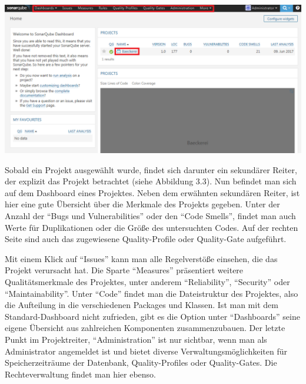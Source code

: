 \begin{minipage}{\linewidth}
	\centering
	\includegraphics[scale=0.55]{img/StartSeiteSonar.PNG}
	\vspace{2em}
\end{minipage}

Sobald ein Projekt ausgewählt wurde, findet sich darunter ein sekundärer Reiter, der explizit das Projekt betrachtet (siehe Abbildung 3.3). Nun befindet man sich auf dem Dashboard eines Projektes. Neben dem erwähnten sekundären Reiter, ist hier eine gute Übersicht über die Merkmale des Projekts gegeben. Unter der Anzahl der \enquote{Bugs und Vulnerabilities} oder den \enquote{Code Smells}, findet man auch Werte für Duplikationen oder die Größe des untersuchten Codes. Auf der rechten Seite sind auch das zugewiesene Quality-Profile oder Quality-Gate aufgeführt.

Mit einem Klick auf \enquote{Issues} kann man alle Regelverstöße einsehen, die das Projekt verursacht hat. Die Sparte \enquote{Measures} präsentiert weitere Qualitätsmerkmale des Projektes, unter anderem \enquote{Reliability}, \enquote{Security} oder \enquote{Maintainability}. Unter \enquote{Code} findet man die Dateistruktur des Projektes, also die Aufteilung in die verschiedenen Packages und Klassen. Ist man mit dem Standard-Dashboard nicht zufrieden, gibt es die Option unter \enquote{Dashboards} seine eigene Übersicht aus zahlreichen Komponenten zusammenzubauen. Der letzte Punkt im Projektreiter, \enquote{Administration} ist nur sichtbar, wenn man als Administrator angemeldet ist und bietet diverse Verwaltungsmöglichkeiten für Speicherzeiträume der Datenbank, Quality-Profiles oder Quality-Gates. Die Rechteverwaltung findet man hier ebenso.



